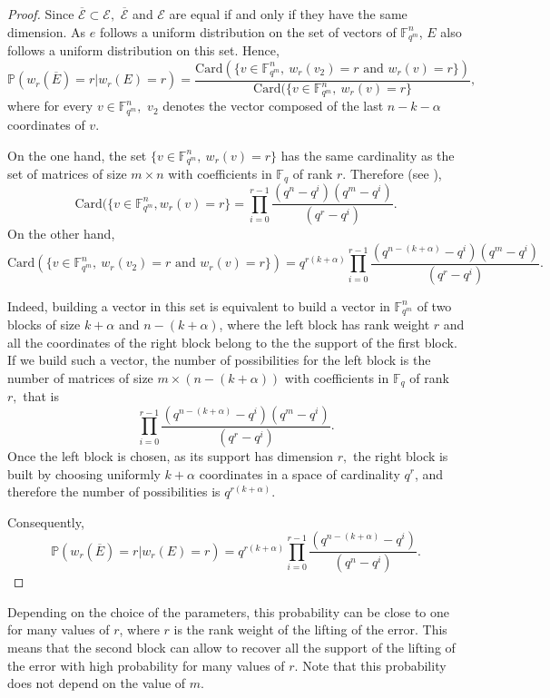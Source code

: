 \documentclass{article}
\newcommand{\Fq}{\mathbb{F}_q}
\newcommand{\Fqm}{\mathbb{F}_{q^m}}
\theoremstyle{definition}
\begin{document}
\begin{proof}Since $\overline{\mathcal{E}}  \subset \mathcal{E},$ $\overline{\mathcal{E}}$ and $\mathcal{E}$ are equal if and only if they have the same dimension.
      As $e$ follows a uniform distribution on the set of vectors of $\Fqm^n$, $E$ also follows a uniform distribution on this set. Hence, \[\mathbb{P}(w_r(\overline{E})=r|w_r(E)=r) = \frac{\text{Card}( \{v \in  \Fqm^n,~ w_r(v_2) = r \text{ and } w_r(v) = r\})}{\text{Card}( \{v \in  \Fqm^n,~ w_r(v) = r\}},\]
      where for every $v \in \mathbb{F}_{q^m}^n,$ $v_2$ denotes the vector composed of the last $n-k-\alpha$ coordinates of $v.$

      \noindent On the one hand, the set $\{v \in  \Fqm^n,~ w_r(v) = r\}$ has the same cardinality as the set of matrices of size $m\times n$ with coefficients in $\Fq$ of rank $r.$ Therefore (see \cite{pless_handbook_nodate}), \[\text{Card}( \{v \in  \Fqm^n, w_r(v) = r\} = \prod_{i=0}^{r-1} \frac{(q^n-q^i)(q^m-q^i)}{(q^r- q^i)}.\]
      On the other hand, {\small \[\text{Card}( \{v \in  \Fqm^n,~ w_r(v_2) = r \text{ and } w_r(v) = r\}) = q^{r(k+\alpha)} \prod_{i=0}^{r-1} \frac{(q^{n-(k+\alpha)}-q^i)(q^m-q^i)}{(q^r- q^i)}.\] }

      \noindent Indeed, building a vector in this set is equivalent to build a vector in $\Fqm^n$ of two blocks of size $k+\alpha$ and $n-(k+\alpha)$, where the left block has rank weight $r$ and all the coordinates of the right block belong to the the support of the first block. If we build such a vector, the number of possibilities for the left block is the number of matrices of size $m \times (n-(k+\alpha))$ with coefficients in $\Fq$ of rank $r,$ that is \[\prod_{i=0}^{r-1} \frac{(q^{n-(k+\alpha)
                        }-q^i)(q^m-q^i)}{(q^r- q^i)}. \] Once the left block is chosen, as its support has dimension $r,$ the right block is built by choosing uniformly $k+\alpha$ coordinates in a space of cardinality $q^r$, and therefore the number of possibilities is $q^{r(k+\alpha)}.$

      \noindent Consequently, \[ \mathbb{P}(w_r(\overline{E})=r|w_r(E)=r) = q^{r(k+\alpha)} \prod_{i=0}^{r-1} \frac{(q^{n-(k+\alpha)}-q^i)}{(q^n -q^i)}. \]
\end{proof}

\noindent Depending on the choice of the parameters, this probability can be close to one for many values of $r$, where $r$ is the rank weight of the lifting of the error. This means that the second block can allow to recover all the support of the lifting of the error with high probability for many values of $r$. Note that this probability does not depend on the value of $m$.  \\
\end{document}
